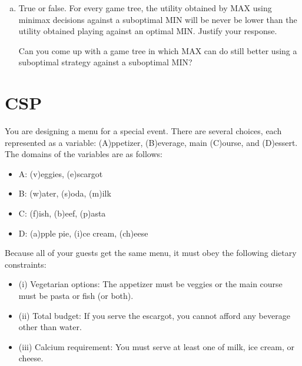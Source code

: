 \documentclass[a4paper]{article}
\begin{document}
\begin{enumerate}[(a)]
\newpage
\item True or false. For every game tree, the utility obtained by MAX using minimax decisions against a suboptimal MIN will be never be lower than the utility obtained playing against an optimal MIN. Justify your response. 

\vspace{15em}



Can you come up with a game tree in which MAX can do still better using a suboptimal strategy against a suboptimal MIN?

\vspace{10em}

\end{enumerate}

\section{CSP}

You are designing a menu for a special event. There are several choices, each represented as a variable:
(A)ppetizer, (B)everage, main (C)ourse, and (D)essert. The domains of the variables are as follows:
\begin{itemize}
\item A: (v)eggies, (e)scargot
\item B: (w)ater, (s)oda, (m)ilk
\item C: (f)ish, (b)eef, (p)asta
\item D: (a)pple pie, (i)ce cream, (ch)eese
\end{itemize}
Because all of your guests get the same menu, it must obey the following dietary constraints:
\begin{itemize}
\item (i) Vegetarian options: The appetizer must be veggies or the main course must be pasta or fish (or both).
\item (ii) Total budget: If you serve the escargot, you cannot afford any beverage other than water.
\item (iii) Calcium requirement: You must serve at least one of milk, ice cream, or cheese.
\end{itemize}
\end{document}
